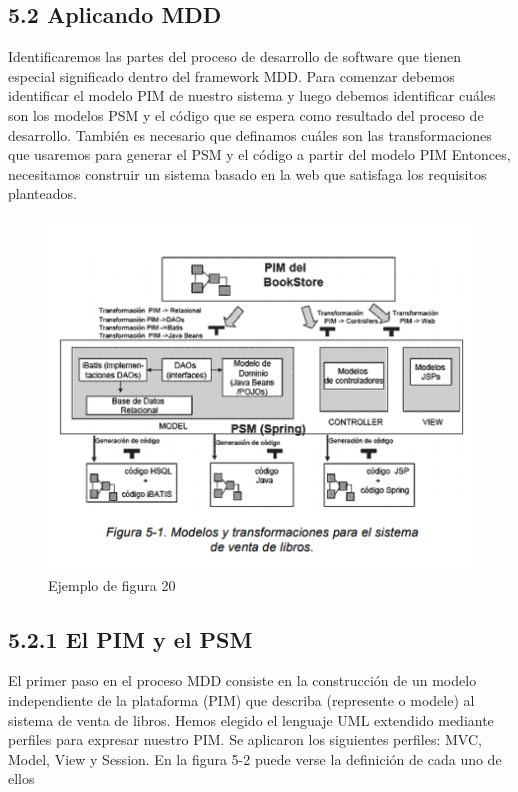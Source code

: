 \subsection{5.2 Aplicando MDD}

Identificaremos las partes del proceso de desarrollo de software que tienen especial significado dentro del framework MDD. Para comenzar debemos identificar el modelo PIM de nuestro sistema y luego debemos identificar cuáles son los modelos PSM y el código que se espera como resultado del proceso de desarrollo. También es necesario que definamos cuáles son las transformaciones que usaremos para generar el PSM y el código a partir del modelo PIM
Entonces, necesitamos construir un sistema basado en la web que satisfaga los requisitos planteados.

\begin{figure}[H]
\centering
\includegraphics[scale=0.9]{./Imagenes/modelo20}
\caption{Ejemplo de figura 20}
\label{figura20}
\end{figure}


\subsection{5.2.1 El PIM y el PSM}

El primer paso en el proceso MDD consiste en la construcción de un modelo independiente de la plataforma (PIM) que describa (represente o modele) al sistema de venta de libros. Hemos elegido el lenguaje UML extendido mediante perfiles para expresar nuestro PIM. Se aplicaron los siguientes perfiles: MVC, Model, View y Session. En la figura 5-2 puede verse la definición de cada uno de ellos

